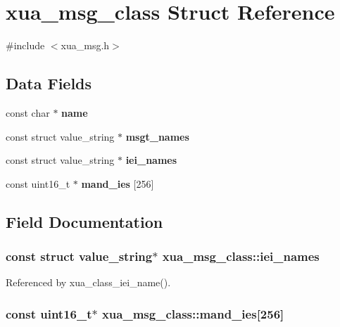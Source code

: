 \section{xua\+\_\+msg\+\_\+class Struct Reference}
\label{structxua__msg__class}


{\ttfamily \#include $<$xua\+\_\+msg.\+h$>$}

\subsection*{Data Fields}
\begin{DoxyCompactItemize}
\item 
const char $\ast$ {\bf name}
\item 
const struct value\+\_\+string $\ast$ {\bf msgt\+\_\+names}
\item 
const struct value\+\_\+string $\ast$ {\bf iei\+\_\+names}
\item 
const uint16\+\_\+t $\ast$ {\bf mand\+\_\+ies} [256]
\end{DoxyCompactItemize}


\subsection{Field Documentation}
\subsubsection[{iei\+\_\+names}]{\setlength{\rightskip}{0pt plus 5cm}const struct value\+\_\+string$\ast$ xua\+\_\+msg\+\_\+class\+::iei\+\_\+names}\label{structxua__msg__class_ad33ae1cca2ab4da12677fb428c9ab3e7}


Referenced by xua\+\_\+class\+\_\+iei\+\_\+name().

\subsubsection[{mand\+\_\+ies}]{\setlength{\rightskip}{0pt plus 5cm}const uint16\+\_\+t$\ast$ xua\+\_\+msg\+\_\+class\+::mand\+\_\+ies[256]}\label{structxua__msg__class_a2a448b5350c38c04bfc036d67b024884}


